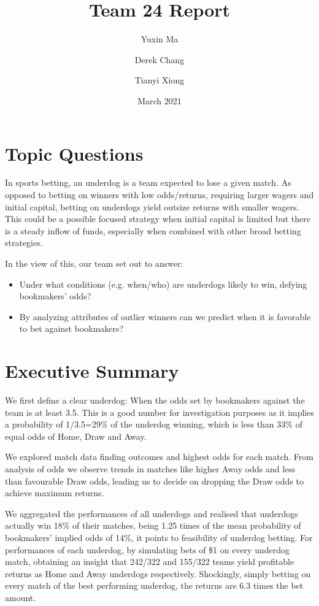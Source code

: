 \documentclass[12pt, a4paper]{article}
\title{Team 24 Report}
\author{Yuxin Ma \and Derek Chang \and Tianyi Xiong }
\date{March 2021}
\begin{document}
\maketitle

\section{Topic Questions}
In sports betting, an underdog is a team expected to lose a given match. As opposed to betting on winners with low odds/returns, requiring larger wagers and initial capital, betting on underdogs yield outsize returns with smaller wagers. This could be a possible focused strategy when initial capital is limited but there is a steady inflow of funds, especially when combined with other broad betting strategies. 

In the view of this, our team set out to answer:
\begin{itemize}
    \item  Under what conditions (e.g. when/who) are underdogs likely to win, defying bookmakers’ odds? 
    \item By analyzing attributes of outlier winners can we predict when it is favorable to bet against bookmakers?
\end{itemize}


\section{Executive Summary}
We first define a clear underdog: When the odds set by bookmakers against the team is at least 3.5. This is a good number for investigation purposes as it implies a probability of 1/3.5=29$\%$ of the underdog winning, which is less than 33$\%$ of equal odds of Home, Draw and Away.

We explored match data finding outcomes and highest odds for each match. From analysis of odds we observe trends in matches like higher Away odds and less than favourable Draw odds, leading us to decide on dropping the Draw odds to achieve maximum returns.

We aggregated the performances of all underdogs and realised that underdogs actually win 18$\%$ of their matches, being 1.25 times of the mean probability of bookmakers' implied odds of 14$\%$, it points to feasibility of underdog betting. For performances of each underdog, by simulating bets of \$1 on every underdog match, obtaining an insight that 242/322 and 155/322 teams yield profitable returns as Home and Away underdogs respectively. Shockingly, simply betting on every match of the best performing underdog, the returns are 6.3 times the bet amount.
\end{document}
